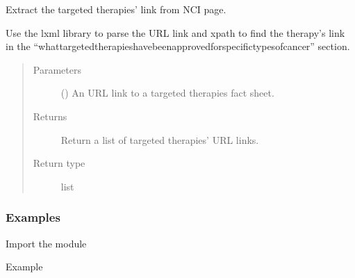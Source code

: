 \documentclass[letterpaper,10pt,english]{sphinxmanual}
\begin{document}

\begin{fulllineitems}
\label{\detokenize{biomarker_extraction:biomarker_extraction.targeted_therapy_url}}
\sphinxAtStartPar
Extract the targeted therapies’ link from NCI page.

\sphinxAtStartPar
Use the lxml library to parse the URL link and xpath to find the therapy’s link in the “what\sphinxhyphen{}targeted\sphinxhyphen{}therapies\sphinxhyphen{}have\sphinxhyphen{}been\sphinxhyphen{}approved\sphinxhyphen{}for\sphinxhyphen{}specific\sphinxhyphen{}types\sphinxhyphen{}of\sphinxhyphen{}cancer” section.
\begin{quote}\begin{description}
\item[{Parameters}] \leavevmode
\sphinxAtStartPar
{} () \textendash{} An URL link to a targeted therapies fact sheet.

\item[{Returns}] \leavevmode
\sphinxAtStartPar
Return a list of targeted therapies’ URL links.

\item[{Return type}] \leavevmode
\sphinxAtStartPar
list

\end{description}\end{quote}
\subsubsection*{Examples}

\sphinxAtStartPar
Import the module

\begin{sphinxVerbatim}[commandchars=\\\{\}]
   
\end{sphinxVerbatim}

\sphinxAtStartPar
Example


\end{fulllineitems}
\end{document}
